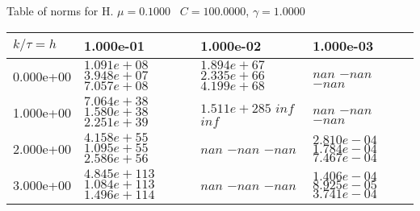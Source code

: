 \begin{center}
Table of norms for H. $\mu = 0.1000$ \, $C = 100.0000$, $\gamma = 1.0000$
  
\begin{tabular}{|p{1in}|p{1in}|p{1in}|p{1in}|} \hline
$k / \tau = h$ &1.000e-01 &1.000e-02 &1.000e-03 \\ \hline 
0.000e+00 & $1.091e+08$  $3.948e+07$  $7.057e+08$  & $1.894e+67$  $2.335e+66$  $4.199e+68$  & $nan$  $-nan$  $-nan$  \\ \hline 
1.000e+00 & $7.064e+38$  $1.580e+38$  $2.251e+39$  & $1.511e+285$  $inf$  $inf$  & $nan$  $-nan$  $-nan$  \\ \hline 
2.000e+00 & $4.158e+55$  $1.095e+55$  $2.586e+56$  & $nan$  $-nan$  $-nan$  & $2.810e-04$  $1.784e-04$  $7.467e-04$  \\ \hline 
3.000e+00 & $4.845e+113$  $1.084e+113$  $1.496e+114$  & $nan$  $-nan$  $-nan$  & $1.406e-04$  $8.925e-05$  $3.741e-04$  \\ \hline 

\end{tabular}\\[20pt]
\end{center}

